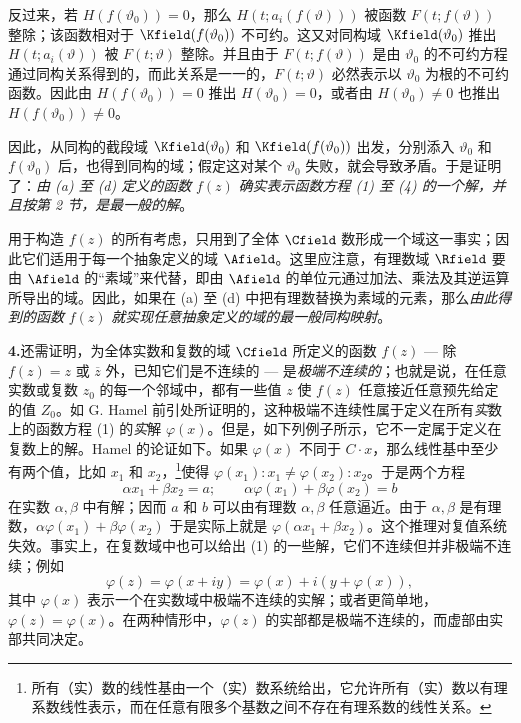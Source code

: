 反过来，若 $H(f(\vartheta_0))=0$，那么 $H(t;a_i(f(\vartheta)))$ 被函数 $F(t;f(\vartheta))$ 整除；该函数相对于 $\Kfield(f(\vartheta_0))$ 不可约。这又对同构域 $\Kfield(\vartheta_0)$ 推出 $H(t;a_i(\vartheta))$ 被 $F(t;\vartheta)$ 整除。并且由于 $F(t;f(\vartheta))$ 是由 $\vartheta_0$ 的不可约方程通过同构关系得到的，而此关系是一一的，$F(t;\vartheta)$ 必然表示以 $\vartheta_0$ 为根的不可约函数。因此由 $H(f(\vartheta_0))=0$ 推出 $H(\vartheta_0)=0$，或者由 $H(\vartheta_0)\ne0$ 也推出 $H(f(\vartheta_0))\ne0$。

因此，从同构的截段域 $\Kfield(\vartheta_0)$ 和 $\Kfield(f(\vartheta_0))$ 出发，分别添入 $\vartheta_0$ 和 $f(\vartheta_0)$ 后，也得到同构的域；假定这对某个 $\vartheta_0$ 失败，就会导致矛盾。于是证明了：\emph{由 (a) 至 (d) 定义的函数} $f(z)$ \emph{确实表示函数方程 (1) 至 (4) 的一个解，并且按第 2 节，是最一般的解}。

用于构造 $f(z)$ 的所有考虑，只用到了全体 $\Cfield$ 数形成一个域这一事实；因此它们适用于每一个抽象定义的域 $\Afield$。这里应注意，有理数域 $\Rfield$ 要由 $\Afield$ 的“素域”来代替，即由 $\Afield$ 的单位元通过加法、乘法及其逆运算所导出的域。因此，如果在 (a) 至 (d) 中把有理数替换为素域的元素，那么\emph{由此得到的函数} $f(z)$ \emph{就实现任意抽象定义的域的最一般同构映射}。

\medskip
\noindent\textbf{4.}\quad 还需证明，为全体实数和复数的域 $\Cfield$ 所定义的函数 $f(z)$ --- 除 $f(z)=z$ 或 $\overline z$ 外，已知它们是不连续的 --- 是\emph{极端不连续的}；也就是说，在任意实数或复数 $z_0$ 的每一个邻域中，都有一些值 $z$ 使 $f(z)$ 任意接近任意预先给定的值 $Z_0$。如 G. Hamel 前引处所证明的，这种极端不连续性属于定义在所有\emph{实}数上的函数方程 (1) 的\emph{实}解 $\varphi(x)$。但是，如下列例子所示，它不一定属于定义在复数上的解。Hamel 的论证如下。如果 $\varphi(x)$ 不同于 $C\cdot x$，那么线性基中至少有两个值，比如 $x_1$ 和 $x_2$，\footnote{所有（实）数的线性基由一个（实）数系统给出，它允许所有（实）数以有理系数线性表示，而在任意有限多个基数之间不存在有理系数的线性关系。}使得 $\varphi(x_1):x_1\ne\varphi(x_2):x_2$。于是两个方程
\[
\alpha x_1+\beta x_2=a;\qquad \alpha\varphi(x_1)+\beta\varphi(x_2)=b
\]
在实数 $\alpha,\beta$ 中有解；因而 $a$ 和 $b$ 可以由有理数 $\alpha,\beta$ 任意逼近。由于 $\alpha,\beta$ 是有理数，$\alpha\varphi(x_1)+\beta\varphi(x_2)$ 于是实际上就是 $\varphi(\alpha x_1+\beta x_2)$。这个推理对复值系统失效。事实上，在复数域中也可以给出 (1) 的一些解，它们不连续但并非极端不连续；例如
\[
\varphi(z)=\varphi(x+iy)=\varphi(x)+i(y+\varphi(x)),
\]
其中 $\varphi(x)$ 表示一个在实数域中极端不连续的实解；或者更简单地，$\varphi(z)=\varphi(x)$。在两种情形中，$\varphi(z)$ 的实部都是极端不连续的，而虚部由实部共同决定。

